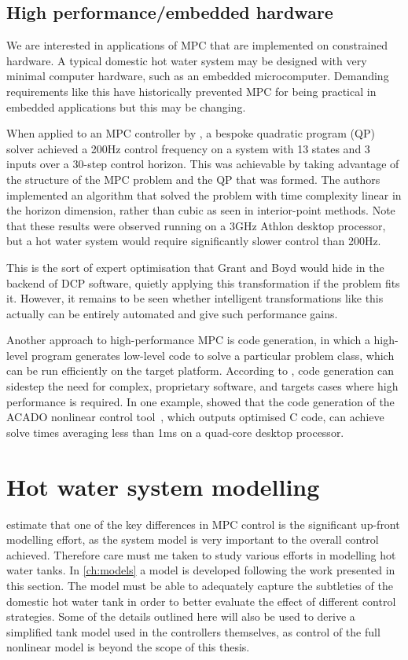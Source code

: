 \subsection{High performance/embedded hardware}

We are interested in applications of MPC that are implemented on constrained hardware.
A typical domestic hot water system may be designed with very minimal computer hardware, such as an embedded microcomputer.
Demanding requirements like this have historically prevented MPC for being practical in embedded applications but this may be changing.

When applied to an MPC controller by \textcite{Wang10}, a bespoke quadratic program (QP) solver achieved a 200Hz control frequency on a system with 13 states and 3 inputs over a 30-step control horizon.
This was achievable by taking advantage of the structure of the MPC problem and the QP that was formed.
The authors implemented an algorithm that solved the problem with time complexity linear in the horizon dimension, rather than cubic as seen in interior-point methods.
Note that these results were observed running on a 3GHz Athlon desktop processor, but a hot water system would require significantly slower control than 200Hz.

This is the sort of expert optimisation that Grant and Boyd would hide in the backend of DCP software, quietly applying this transformation if the problem fits it.
However, it remains to be seen whether intelligent transformations like this actually can be entirely automated and give such performance gains.

Another approach to high-performance MPC is code generation, in which a high-level program generates low-level code to solve a particular problem class, which can be run efficiently on the target platform.
According to \textcite{Mattingley12}, code generation can sidestep the need for complex, proprietary software, and targets cases where high performance is required.
In one example, \textcite{Vukov12} showed that the code generation of the ACADO nonlinear control tool~\cite{ACADO}, which outputs optimised C code, can achieve solve times averaging less than 1ms on a quad-core desktop processor.

\section{Hot water system modelling}

 estimate that one of the key differences in MPC control is the significant up-front modelling effort, as the system model is very important to the overall control achieved.
Therefore care must me taken to study various efforts in modelling hot water tanks.
In \autoref{ch:models} a model is developed following the work presented in this section.
The model must be able to adequately capture the subtleties of the domestic hot water tank in order to better evaluate the effect of different control strategies.
Some of the details outlined here will also be used to derive a simplified tank model used in the controllers themselves, as control of the full nonlinear model is beyond the scope of this thesis.

